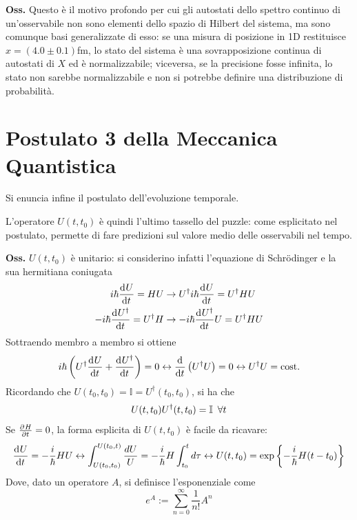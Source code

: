 \textbf{Oss.} Questo è il motivo profondo per cui gli autostati dello spettro continuo di un'osservabile
non sono elementi dello spazio di Hilbert del sistema, ma sono comunque basi generalizzate di esso:
se una misura di posizione in 1D restituisce $x=(4.0\pm0.1)$fm, lo stato del sistema è una sovrapposizione
continua di autostati di $X$ ed è normalizzabile; viceversa, se la precisione fosse infinita, lo stato non
sarebbe normalizzabile e non si potrebbe definire una distribuzione di probabilità.
\section{Postulato 3 della Meccanica Quantistica}
Si enuncia infine il postulato dell'evoluzione temporale.

\noindent{}

L'operatore $U(t,t_0)$ è quindi l'ultimo tassello del puzzle: come esplicitato nel postulato, permette
di fare predizioni sul valore medio delle osservabili nel tempo.

\textbf{Oss.} $U(t,t_0)$ è unitario: si considerino infatti l'equazione di Schrödinger e la sua hermitiana
coniugata
\begin{align*}
    i\hbar\dv[]{U}{t} = HU &\rightarrow U^{\dagger}i\hbar\dv[]{U}{t} = U^{\dagger}HU\\
    -i\hbar\dv[]{U^{\dagger}}{t} = U^{\dagger}H &\rightarrow -i\hbar\dv[]{U^{\dagger}}{t}U = U^{\dagger}HU
\end{align*}
Sottraendo membro a membro si ottiene
$$ i\hbar\left(U^{\dagger}\dv[]{U}{t}+\dv[]{U^{\dagger}}{t}\right) = 0 \leftrightarrow
\dv[]{}{t}\left(U^{\dagger}U\right) = 0 \leftrightarrow U^{\dagger}U=\text{cost.}$$
Ricordando che $U(t_0,t_0) = \mathbb{I} = U^{\dagger}(t_0,t_0)$, si ha che
$$ U(t,t_0)U^{\dagger}(t,t_0)=\mathbb{I}\mkern9mu \forall t$$
Se $\pdv[]{H}{t}=0$, la forma esplicita di $U(t,t_0)$ è facile da ricavare:
$$\dv[]{U}{t} = -\frac{i}{\hbar}HU \leftrightarrow \int_{U(t_0,t_0)}^{U(t_0,t)}\frac{dU}{U} =
-\frac{i}{\hbar}H\int_{t_0}^{t}d\tau \leftrightarrow U(t,t_0)=\exp\left\{-\frac{i}{\hbar}H(t-t_0)\right\}$$
Dove, dato un operatore $A$, si definisce l'esponenziale come
$$e^A:=\sum_{n=0}^{\infty}\frac{1}{n!}A^n$$

